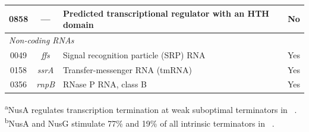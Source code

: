 \begin{table}[htbp]
\begin{tabular}{c c p{9.2cm} c}
0858 & --- & Predicted transcriptional regulator with an HTH domain & No \\
\midrule
\multicolumn{4}{l}{\textit{Non-coding RNAs}}\\
0049 & \textit{ffs}  & Signal recognition particle (SRP) RNA & Yes \\
0158 & \textit{ssrA} & Transfer-messenger RNA (tmRNA) & Yes \\
0356 & \textit{rnpB} & RNase P RNA, class B & Yes \\
\bottomrule
\end{tabular}
\par\smallskip
{\footnotesize
\begin{minipage}{\textwidth}
\raggedright
\textsuperscript{a}NusA regulates transcription termination at weak suboptimal terminators in \Bsub~\cite{mondal_nusa-dependent_2016}.\\
\textsuperscript{b}NusA and NusG stimulate 77\% and 19\% of all intrinsic terminators in \Bsub~\cite{mandell_comprehensive_2022}.
\end{minipage}}
\end{table}

\newpage